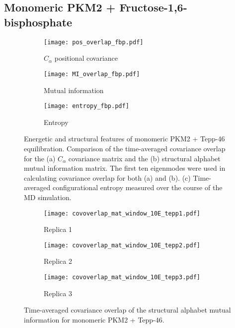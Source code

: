 \documentclass[11pt]{article}
\begin{document}
\subsection*{Monomeric PKM2 + Fructose-1,6-bisphosphate}
\begin{figure}[!ht]
\centering
\begin{subfigure}[b]{.4\linewidth}
    \centering
    \texttt{[image: pos\_overlap\_fbp.pdf]}
    \caption{$C_\alpha$ positional covariance}\label{fig:3a}
  \end{subfigure}%
  \begin{subfigure}[b]{.4\linewidth}
    \centering
    \texttt{[image: MI\_overlap\_fbp.pdf]}
    \caption{Mutual information}\label{fig:3b}
  \end{subfigure}%
  \begin{subfigure}[b]{.4\linewidth}
    \centering
    \texttt{[image: entropy\_fbp.pdf]}
    \caption{Entropy}\label{fig:3b}
  \end{subfigure}%
\caption{Energetic and structural features of monomeric PKM2 + Tepp-46 equilibration. Comparison of the time-averaged covariance overlap for the (a) $C_\alpha$ covariance matrix and the (b) structural alphabet mutual information matrix. The first ten eigenmodes were used in calculating covariance overlap for both (a) and (b). (c) Time-averaged configurational entropy measured over the course of the MD simulation.}\label{fig:2}
\end{figure}
\begin{figure}[!ht]
\centering
\begin{subfigure}[b]{.4\linewidth}
    \centering
    \texttt{[image: covoverlap\_mat\_window\_10E\_tepp1.pdf]}
    \caption{Replica 1}\label{fig:4a}
  \end{subfigure}%
  \begin{subfigure}[b]{.4\linewidth}
    \centering
    \texttt{[image: covoverlap\_mat\_window\_10E\_tepp2.pdf]}
    \caption{Replica 2}\label{fig:3b}
  \end{subfigure}%
  \begin{subfigure}[b]{.4\linewidth}
    \centering
    \texttt{[image: covoverlap\_mat\_window\_10E\_tepp3.pdf]}
    \caption{Replica 3}\label{fig:3b}
  \end{subfigure}%
\caption{Time-averaged covariance overlap of the structural alphabet mutual information for monomeric PKM2 + Tepp-46.}\label{fig:2}
\end{figure}
\end{document}
